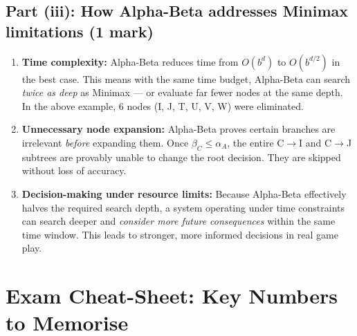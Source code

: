 \documentclass[12pt, a4paper]{article}
\newenvironment{answerbox}{\begin{mdframed}[style=answerframe]}{\end{mdframed}}
\begin{document}
\subsection*{Part (iii): How Alpha-Beta addresses Minimax limitations (1 mark)}

\begin{answerbox}
\begin{enumerate}[noitemsep]
  \item \textbf{Time complexity:} Alpha-Beta reduces time from $O(b^d)$ to $O(b^{d/2})$ in the best case. This means with the same time budget, Alpha-Beta can search \textit{twice as deep} as Minimax --- or evaluate far fewer nodes at the same depth. In the above example, 6 nodes (I, J, T, U, V, W) were eliminated.

  \item \textbf{Unnecessary node expansion:} Alpha-Beta proves certain branches are irrelevant \textit{before} expanding them. Once $\beta_C \leq \alpha_A$, the entire C$\to$I and C$\to$J subtrees are provably unable to change the root decision. They are skipped without loss of accuracy.

  \item \textbf{Decision-making under resource limits:} Because Alpha-Beta effectively halves the required search depth, a system operating under time constraints can search deeper and \textit{consider more future consequences} within the same time window. This leads to stronger, more informed decisions in real game play.
\end{enumerate}
\end{answerbox}

\section*{Exam Cheat-Sheet: Key Numbers to Memorise}
\end{document}
